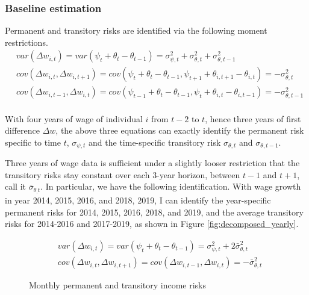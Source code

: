 \subsubsection{Baseline estimation}
\label{appendix:risk_identification}
Permanent and transitory risks are identified via the following moment restrictions.
\begin{equation}
\begin{split}
   & var(\Delta w_{i,t}) = var(\psi_t+\theta_t-\theta_{t-1}) = \sigma^2_{\psi,t} + \sigma^2_{\theta,t}+\sigma^2_{\theta,t-1} \\
  &  cov(\Delta w_{i,t},\Delta w_{i,t+1}) =cov(\psi_t+\theta_t-\theta_{t-1}, \psi_{t+1}+\theta_{i,t+1}-\theta_{i,t}) = - \sigma^2_{\theta,t} \\
  &  cov(\Delta w_{i,t-1},\Delta w_{i,t}) =cov(\psi_{t-1}+\theta_t-\theta_{t-1}, \psi_{t}+\theta_{i,t}-\theta_{i,t-1})= - \sigma^2_{\theta,t-1} \\
\end{split}
\end{equation}

With four years of wage of individual $i$ from $t-2$ to $t$, hence three years of first difference $\Delta w$, the above three equations can exactly identify the permanent risk specific to time $t$, $\sigma_{\psi,t}$ and the time-specific transitory risk $\sigma_{\theta,t}$ and $\sigma_{\theta,t-1}$. 

Three years of wage data is sufficient under a slightly looser restriction that the transitory risks stay constant over each 3-year horizon, between $t-1$ and $t+1$, call it $\bar \sigma_{\theta_,t}$. In particular, we have the following identification. With wage growth in year 2014, 2015, 2016, and 2018, 2019, I can identify the year-specific permanent risks for 2014, 2015, 2016, 2018, and 2019, and the average transitory risks for 2014-2016 and 2017-2019, as shown in Figure \ref{fig:decomposed_yearly}. 


\begin{equation}
\begin{split}
   & var(\Delta w_{i,t}) = var(\psi_t+\theta_t-\theta_{t-1}) = \sigma^2_{\psi,t} + 2\bar \sigma^2_{\theta,t} \\
  &  cov(\Delta w_{i,t},\Delta w_{i,t+1}) = cov(\Delta w_{i,t-1},\Delta w_{i,t}) = - \bar \sigma^2_{\theta,t} 
\end{split}
\end{equation}


 \begin{figure}[!ht]
    	\caption{Monthly permanent and transitory income risks}
    	\label{fig:decomposed_monthly}
    	\begin{center}
    	\end{center}
    \end{figure}
    
